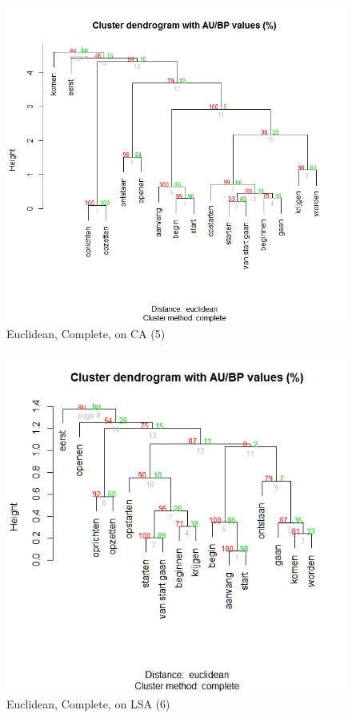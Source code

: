 \begin{figure}
\includegraphics[height=.3\textheight]{figures/Vandevoorde2-img34.png}
\caption{\label{fig:key:34}  Euclidean, Complete, on CA (5)}
\end{figure}

\begin{figure}
\includegraphics[height=.3\textheight]{figures/Vandevoorde2-img35.png}
\caption{\label{fig:key:35}  Euclidean, Complete, on LSA (6)}
\end{figure}

